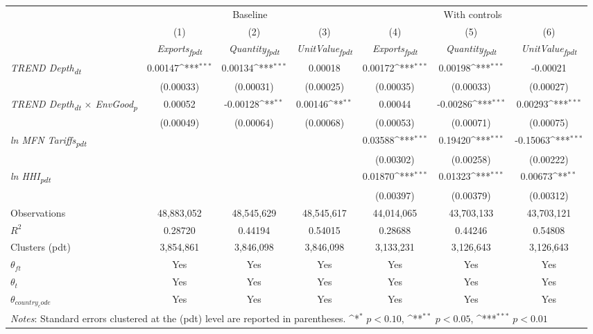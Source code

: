 {
\def\sym#1{\ifmmode^{#1}\else\(^{#1}\)\fi}
\begin{tabular}{l*{6}{c}}
\toprule
&\multicolumn{3}{c}{Baseline}&\multicolumn{3}{c}{With controls}\\\cmidrule(lr){2-4}\cmidrule(lr){5-7}
&(1)&(2)&(3)&(4)&(5)&(6)\\
&\textit{Exports\textsubscript{fpdt}}&\textit{Quantity\textsubscript{fpdt}}&\textit{UnitValue\textsubscript{fpdt}}&\textit{Exports\textsubscript{fpdt}}&\textit{Quantity\textsubscript{fpdt}}&\textit{UnitValue\textsubscript{fpdt}}\\
\midrule
\textit{TREND Depth\textsubscript{dt}} & 0.00147\sym{***} & 0.00134\sym{***} & 0.00018 & 0.00172\sym{***} & 0.00198\sym{***} & -0.00021\\
 & (0.00033) & (0.00031) & (0.00025) & (0.00035) & (0.00033) & (0.00027)\\
\addlinespace
\textit{TREND Depth\textsubscript{dt} $\times$ EnvGood\textsubscript{p}} & 0.00052 & -0.00128\sym{**} & 0.00146\sym{**} & 0.00044 & -0.00286\sym{***} & 0.00293\sym{***}\\
 & (0.00049) & (0.00064) & (0.00068) & (0.00053) & (0.00071) & (0.00075)\\
\addlinespace
\textit{ln MFN Tariffs\textsubscript{pdt}} &  &  &  & 0.03588\sym{***} & 0.19420\sym{***} & -0.15063\sym{***}\\
 &  &  &  & (0.00302) & (0.00258) & (0.00222)\\
\addlinespace
\textit{ln HHI\textsubscript{pdt}} &  &  &  & 0.01870\sym{***} & 0.01323\sym{***} & 0.00673\sym{**}\\
 &  &  &  & (0.00397) & (0.00379) & (0.00312)\\
\midrule
Observations & 48,883,052 & 48,545,629 & 48,545,617 & 44,014,065 & 43,703,133 & 43,703,121\\
$R^{2}$ & 0.28720 & 0.44194 & 0.54015 & 0.28688 & 0.44246 & 0.54808\\
Clusters (pdt) & 3,854,861 & 3,846,098 & 3,846,098 & 3,133,231 & 3,126,643 & 3,126,643\\
$\theta_{ft}$ & Yes & Yes & Yes & Yes & Yes & Yes\\
$\theta_{t}$ & Yes & Yes & Yes & Yes & Yes & Yes\\
$\theta_{country_code}$ & Yes & Yes & Yes & Yes & Yes & Yes\\
\bottomrule
\multicolumn{7}{l}{\footnotesize \textit{Notes}: Standard errors clustered at the (pdt) level are reported in parentheses. \sym{*} \(p<0.10\), \sym{**} \(p<0.05\), \sym{***} \(p<0.01\)}\\
\end{tabular}
}
